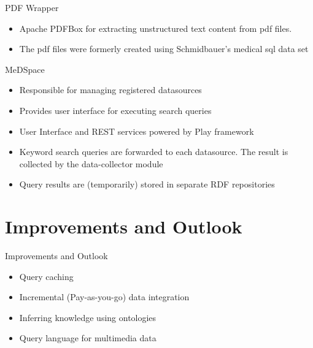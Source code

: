 \begin{frame}{PDF Wrapper}
    \begin{itemize}
    \item Apache PDFBox \cite{PDFBox} for extracting unstructured text content from pdf files.
    \item The pdf files were formerly created using Schmidbauer's medical sql data set \cite{SchmidbauerBachelorThesis}
    \end{itemize}
\end{frame}

\begin{frame}{MeDSpace}
    \begin{itemize}
    \item Responsible for managing registered datasources
    \item Provides user interface for executing search queries
    \item User Interface and REST services powered by Play framework \cite{Play}
    \item Keyword search queries are forwarded to each datasource. The result is collected by the 
    data-collector module
    \item Query results are (temporarily) stored in separate RDF repositories
    \end{itemize}
\end{frame}


\section{Improvements and Outlook}
\begin{frame}{Improvements and Outlook}
    \begin{itemize}
    \item Query caching
    \item Incremental (Pay-as-you-go) data integration
	\item Inferring knowledge using ontologies    
    \item Query language for multimedia data \cite{6214725}
    \end{itemize}    
\end{frame}